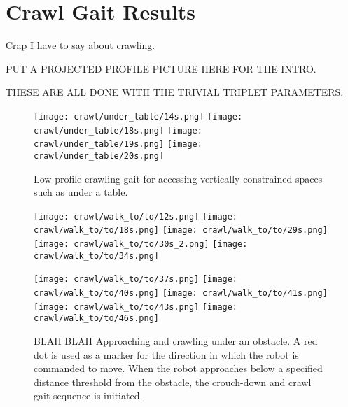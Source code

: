 \chapter{Crawl Gait Results} \label{ch:results_crawl_gait}



Crap I have to say about crawling.

PUT A PROJECTED PROFILE PICTURE HERE FOR THE INTRO.

THESE ARE ALL DONE WITH THE TRIVIAL TRIPLET PARAMETERS.

\begin{figure}
  \vspace*{0.02in}
  \centerline{
    \texttt{[image: crawl/under\_table/14s.png]}
    \texttt{[image: crawl/under\_table/18s.png]}
    \texttt{[image: crawl/under\_table/19s.png]}
    \texttt{[image: crawl/under\_table/20s.png]}
  }
  \caption{Low-profile crawling gait for accessing vertically constrained spaces such as under a table.}
  \label{fig:nao_crawl1}
  \vspace*{-0.07in}
\end{figure}

\begin{figure}
  \centerline{
    \texttt{[image: crawl/walk\_to/to/12s.png]}
    \texttt{[image: crawl/walk\_to/to/18s.png]}
    \texttt{[image: crawl/walk\_to/to/29s.png]}
    \texttt{[image: crawl/walk\_to/to/30s\_2.png]}
    \texttt{[image: crawl/walk\_to/to/34s.png]}
  }
  \vspace*{0.05in}
  \centerline{
    \texttt{[image: crawl/walk\_to/to/37s.png]}
    \texttt{[image: crawl/walk\_to/to/40s.png]}
    \texttt{[image: crawl/walk\_to/to/41s.png]}
    \texttt{[image: crawl/walk\_to/to/43s.png]}
    \texttt{[image: crawl/walk\_to/to/46s.png]}
  }
  \vspace*{-0.05in}
  \caption{BLAH BLAH Approaching and crawling under an obstacle.
           A red dot is used as a marker for the direction in which the robot is commanded to move.
           When the robot approaches below a specified distance threshold from the obstacle,
           the crouch-down and crawl gait sequence is initiated.}
  \label{fig:nao_crawl3}
  \vspace*{-0.15in}
\end{figure}


